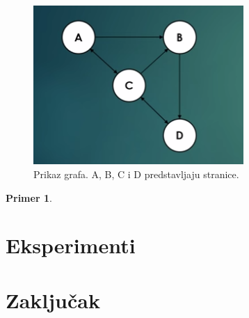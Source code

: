 \documentclass[a4paper]{article}
\newtheorem{primer}{Primer}[section]
\begin{document}
\begin{figure}[t]
\includegraphics[width=8cm]{Pictures/pr1.png}
\centering
\caption{Prikaz grafa. A, B, C i D predstavljaju stranice.}
\end{figure}

 
\begin{primer} 
\end{primer}


\section{Eksperimenti}
\label{sec:prvi}



\section{Zaključak}
\label{sec:zakljucak}

\appendix
 

\end{document}
